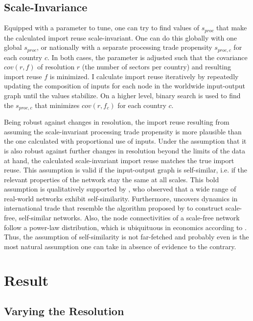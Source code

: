 \documentclass[english]{uzhpub}
\begin{document}
\subsection{Scale-Invariance}
\label{met:scale-invariance}
Equipped with a parameter to tune, one can try to find values of $s_{proc}$ that make the calculated import reuse scale-invariant. One can do this globally with one global $s_{proc}$, or nationally with a separate processing trade propensity $s_{proc, c}$ for each country $c$. In both cases, the parameter is adjusted such that the covariance $cov(r, f)$ of resolution $r$ (the number of sectors per country) and resulting import reuse $f$ is minimized. I calculate import reuse iteratively by repeatedly updating the composition of inputs for each node in the worldwide input-output graph until the values stabilize. On a higher level, binary search is used to find the $s_{proc, c}$ that minimizes $cov(r, f_c)$ for each country $c$.

Being robust against changes in resolution, the import reuse resulting from assuming the scale-invariant processing trade propensity is more plausible than the one calculated with proportional use of inputs. Under the assumption that it is also robust against further changes in resolution beyond the limits of the data at hand, the calculated scale-invariant import reuse matches the true import reuse. This assumption is valid if the input-output graph is self-similar, i.e. if the relevant properties of the network stay the same at all scales. This bold assumption is qualitatively supported by \cite{song2005self}, who observed that a wide range of real-world networks exhibit self-similarity. Furthermore, \cite{chaney2014network} uncovers dynamics in international trade that resemble the algorithm proposed by \cite{barabasi1999emergence} to construct scale-free, self-similar networks. Also, the node connectivities of a scale-free network follow a power-law distribution, which is ubiquituous in economics according to \cite{gabaix2016power}. Thus, the assumption of self-similarity is not far-fetched and probably even is the most natural assumption one can take in absence of evidence to the contrary.

\section{Result}
\label{sec:result}

\subsection{Varying the Resolution}
\label{res:varying}
\end{document}
